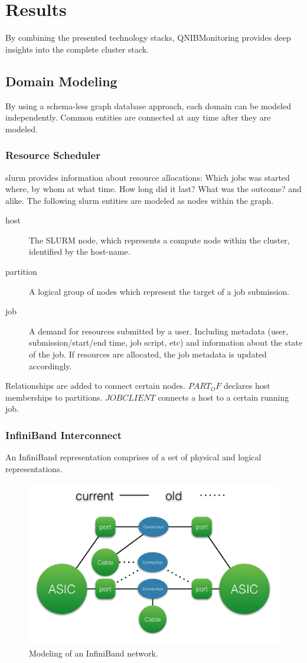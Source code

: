 \section{Results}
By combining the presented technology stacks, QNIBMonitoring provides deep insights into the complete cluster stack.

\subsection{Domain Modeling}
By using a schema-less graph database approach, each domain can be modeled independently. Common entities are connected at any time after
they are modeled.

\subsubsection{Resource Scheduler}
\gls{slurm} provides information about resource allocations: Which jobs was started where, by whom at what time. How long did it last? What was the outcome? and alike.
The following \gls{slurm} entities are modeled as nodes within the graph.
\begin{description}
    \item[host] The SLURM node, which represents a compute node within the cluster, identified by the host-name.
    \item[partition] A logical group of nodes which represent the target of a job submission.
    \item[job] A demand for resources submitted by a user. Including metadata (user, submission/start/end time, job script, etc) and information about the state of the job.
        If resources are allocated, the job metadata is updated accordingly.
\end{description}
Relationships are added to connect certain nodes. $PART_OF$ declares host memberships to partitions. $JOBCLIENT$ connects a host to a certain running job.

\subsubsection{InfiniBand Interconnect}
An InfiniBand representation comprises of a set of physical and logical representations.
\begin{figure}[!ht]
    \includegraphics[width=.4\textwidth]{images/png/infiniband_graph.png}
    \caption{\label{fig:ib_graph}Modeling of an InfiniBand network.}
\end{figure}

